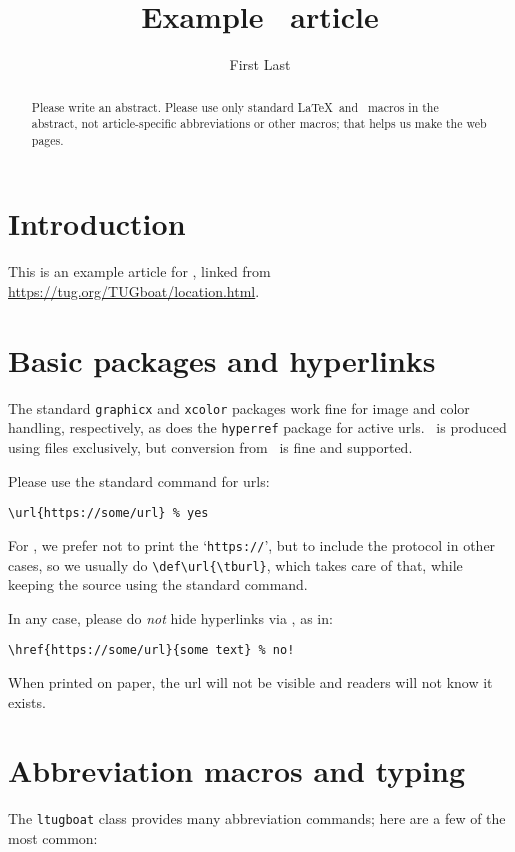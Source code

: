 \documentclass{ltugboat}
\title{Example \TUB\ article}
\author{First Last}
\begin{document}
\maketitle

\begin{abstract}
Please write an abstract. Please use only standard \LaTeX\ and \TUB\
macros in the abstract, not article-specific abbreviations or other
macros; that helps us make the web pages.
\end{abstract}

\section{Introduction}

This is an example article for \TUB, linked from
\url{https://tug.org/TUGboat/location.html}.

\section{Basic packages and hyperlinks}

The standard \texttt{graphicx} and \texttt{xcolor} packages work fine
for image and color handling, respectively, as does the
\texttt{hyperref} package for active urls. \TUB\ is produced using
\acro{PDF} files exclusively, but conversion from \DVI\ is fine and supported.

Please use the standard  command for urls:
\begin{verbatim}
\url{https://some/url} % yes
\end{verbatim}
For \TUB, we prefer not to print the `\texttt{https://}', but to include
the protocol in other cases, so we usually do \verb|\def\url{\tburl}|,
which takes care of that, while keeping the source using the standard
\cs{url} command.

In any case, please do \emph{not} hide hyperlinks via , as in:
\begin{verbatim}
\href{https://some/url}{some text} % no!
\end{verbatim}
When printed on paper, the url will not be visible and readers will
not know it exists.

\section{Abbreviation macros and typing}

The \texttt{ltugboat} class provides many abbreviation commands; here
are a few of the most common:
\end{document}
